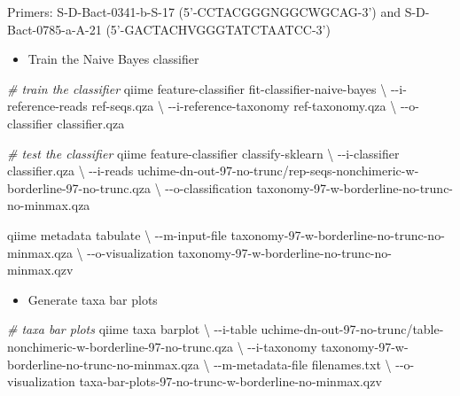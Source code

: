 \documentclass[
]{article}
\newenvironment{Shaded}{\begin{snugshade}}{\end{snugshade}}
\newcommand{\AttributeTok}[1]{\textcolor[rgb]{0.77,0.63,0.00}{#1}}
\newcommand{\CommentTok}[1]{\textcolor[rgb]{0.56,0.35,0.01}{\textit{#1}}}
\newcommand{\DataTypeTok}[1]{\textcolor[rgb]{0.13,0.29,0.53}{#1}}
\newcommand{\ExtensionTok}[1]{#1}
\newcommand{\NormalTok}[1]{#1}
\providecommand{\tightlist}{%
  \setlength{\itemsep}{0pt}\setlength{\parskip}{0pt}}
\begin{document}
Primers: S-D-Bact-0341-b-S-17 (5'-CCTACGGGNGGCWGCAG-3') and
S-D-Bact-0785-a-A-21 (5'-GACTACHVGGGTATCTAATCC-3')

\begin{itemize}
\tightlist
\item
  Train the Naive Bayes classifier
\end{itemize}

\begin{Shaded}
\begin{Highlighting}[]
\CommentTok{\# train the classifier}
\ExtensionTok{qiime}\NormalTok{ feature{-}classifier fit{-}classifier{-}naive{-}bayes }\DataTypeTok{\textbackslash{}}
  \AttributeTok{{-}{-}i{-}reference{-}reads}\NormalTok{ ref{-}seqs.qza }\DataTypeTok{\textbackslash{}}
  \AttributeTok{{-}{-}i{-}reference{-}taxonomy}\NormalTok{ ref{-}taxonomy.qza }\DataTypeTok{\textbackslash{}}
  \AttributeTok{{-}{-}o{-}classifier}\NormalTok{ classifier.qza}

\CommentTok{\# test the classifier}
\ExtensionTok{qiime}\NormalTok{ feature{-}classifier classify{-}sklearn }\DataTypeTok{\textbackslash{}}
  \AttributeTok{{-}{-}i{-}classifier}\NormalTok{ classifier.qza }\DataTypeTok{\textbackslash{}}
  \AttributeTok{{-}{-}i{-}reads}\NormalTok{ uchime{-}dn{-}out{-}97{-}no{-}trunc/rep{-}seqs{-}nonchimeric{-}w{-}borderline{-}97{-}no{-}trunc.qza }\DataTypeTok{\textbackslash{}}
  \AttributeTok{{-}{-}o{-}classification}\NormalTok{ taxonomy{-}97{-}w{-}borderline{-}no{-}trunc{-}no{-}minmax.qza}

\ExtensionTok{qiime}\NormalTok{ metadata tabulate }\DataTypeTok{\textbackslash{}}
  \AttributeTok{{-}{-}m{-}input{-}file}\NormalTok{ taxonomy{-}97{-}w{-}borderline{-}no{-}trunc{-}no{-}minmax.qza }\DataTypeTok{\textbackslash{}}
  \AttributeTok{{-}{-}o{-}visualization}\NormalTok{ taxonomy{-}97{-}w{-}borderline{-}no{-}trunc{-}no{-}minmax.qzv}
\end{Highlighting}
\end{Shaded}

\begin{itemize}
\tightlist
\item
  Generate taxa bar plots
\end{itemize}

\begin{Shaded}
\begin{Highlighting}[]
\CommentTok{\# taxa bar plots}
\ExtensionTok{qiime}\NormalTok{ taxa barplot }\DataTypeTok{\textbackslash{}}
  \AttributeTok{{-}{-}i{-}table}\NormalTok{ uchime{-}dn{-}out{-}97{-}no{-}trunc/table{-}nonchimeric{-}w{-}borderline{-}97{-}no{-}trunc.qza }\DataTypeTok{\textbackslash{}}
  \AttributeTok{{-}{-}i{-}taxonomy}\NormalTok{ taxonomy{-}97{-}w{-}borderline{-}no{-}trunc{-}no{-}minmax.qza }\DataTypeTok{\textbackslash{}}
  \AttributeTok{{-}{-}m{-}metadata{-}file}\NormalTok{ filenames.txt }\DataTypeTok{\textbackslash{}}
  \AttributeTok{{-}{-}o{-}visualization}\NormalTok{ taxa{-}bar{-}plots{-}97{-}no{-}trunc{-}w{-}borderline{-}no{-}minmax.qzv}
\end{Highlighting}
\end{Shaded}
\end{document}
